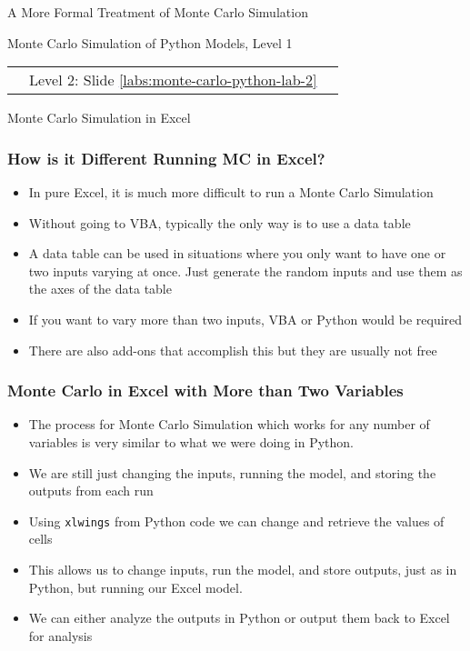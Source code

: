 \documentclass[handout, 11pt]{beamer}
\begin{document}
\begin{section}[Formal MC]{A More Formal Treatment of Monte Carlo Simulation}
\begin{frame}
{\begin{block}{Monte Carlo Simulation of Python Models, Level 1}
\begin{enumerate}
\end{enumerate}
\vfill
\begin{tabular*}{\textwidth}{@{\extracolsep{\fill}}ccc}
\toprule
\hfill & Level 2: Slide \textcolor{blue}{\underline{\ref{labs:monte-carlo-python-lab-2}}} & \hfill\\

\end{tabular*}
\end{block}
}
\label{labs:monte-carlo-python-lab-1}
\end{frame}
\end{section}
\begin{section}[Excel MC]{Monte Carlo Simulation in Excel}
\begin{frame}
\frametitle{How is it Different Running MC in Excel?}
\begin{itemize}
\item In pure Excel, it is much more difficult to run a Monte Carlo Simulation
\vfill
\item Without going to VBA, typically the only way is to use a data table
\vfill
\item A data table can be used in situations where you only want to have one or two inputs varying at once. Just generate the random inputs and use them as the axes of the data table
\vfill
\item If you want to vary more than two inputs, VBA or Python would be required
\vfill
\item There are also add-ons that accomplish this but they are usually not free
\end{itemize}
\end{frame}
\begin{frame}
\frametitle{Monte Carlo in Excel with More than Two Variables}
\begin{itemize}
\item The process for Monte Carlo Simulation which works for any number of variables is very similar to what we were doing in Python.
\vfill
\item We are still just changing the inputs, running the model, and storing the outputs from each run
\vfill
\item Using
\texttt{xlwings}
from Python code we can change and retrieve the values of cells
\vfill
\item This allows us to change inputs, run the model, and store outputs, just as in Python, but running our Excel model.
\vfill
\item We can either analyze the outputs in Python or output them back to Excel for analysis

\end{itemize}
\end{frame}
\end{section}
\end{document}
